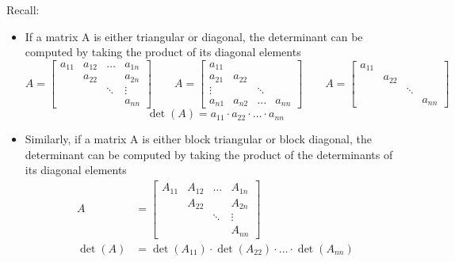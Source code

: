 \documentclass{report}
\begin{document}
\begin{note}
Recall:
\begin{itemize}
\item If a matrix A is either triangular or diagonal, the determinant can be computed by taking the product of its diagonal elements
$$
A = \begin{bmatrix}
a_{11} & a_{12} & \ldots & a_{1n} \\
& a_{22} & & a_{2n} \\
& & \ddots &  \vdots \\
& & & a_{nn} \end{bmatrix} \qquad
A = \begin{bmatrix}
a_{11} & & &  \\
a_{21} & a_{22} & & \\
\vdots & & \ddots & \\
a_{n1} & a_{n2} &  \ldots & a_{nn}
\end{bmatrix} \qquad
A = \begin{bmatrix}
a_{11} & & & \\
& a_{22} & & \\
& & \ddots & \\
& & & a_{nn}
\end{bmatrix}
$$
$$
\operatorname{det}(A) = a_{11} \cdot a_{22} \cdot \ldots \cdot a_{nn}
$$
\item Similarly,  if a matrix A is either block triangular or block diagonal, the determinant can be computed by taking the product of the determinants of its diagonal elements
$$
\begin{aligned}
A & = \begin{bmatrix}
A_{11} & A_{12} & \ldots & A_{1n} \\
& A_{22} & & A_{2n} \\
& & \ddots & \vdots \\
& & & A_{nn}
\end{bmatrix} \\
\operatorname{det}(A) & = \operatorname{det}(A_{11}) \cdot \operatorname{det}(A_{22}) \cdot \ldots \cdot \operatorname{det}(A_{nn})
\end{aligned}
$$
\end{itemize}
\end{note}
\end{document}
